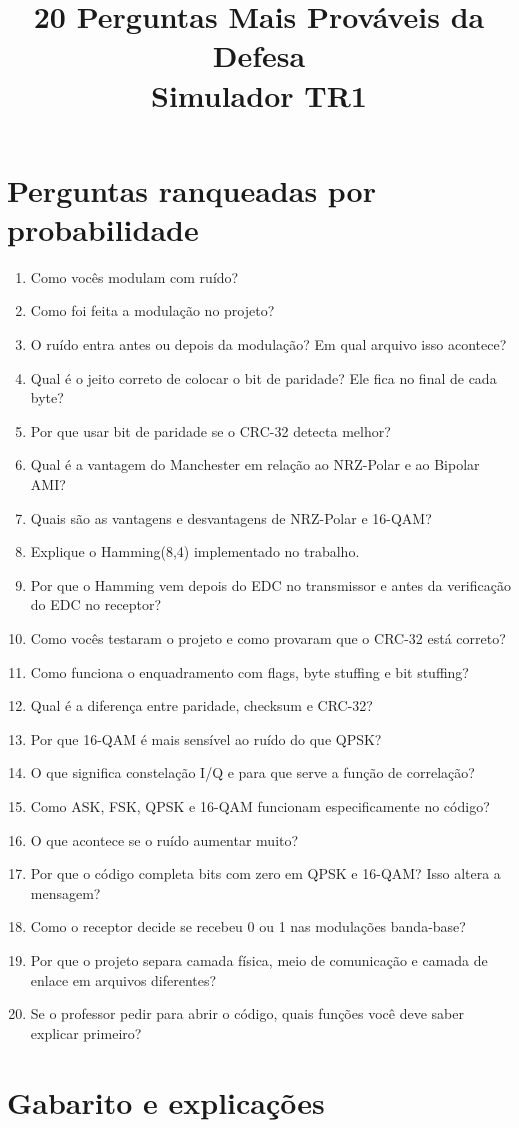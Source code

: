 \documentclass[11pt,a4paper]{article}
\title{\vspace{-1.2cm}20 Perguntas Mais Prováveis da Defesa \\ Simulador TR1}
\author{}
\date{}
\newcommand{\rank}[1]{\textcolor{rankblue}{\textbf{Rank #1}}}
\newcommand{\pergunta}[2]{\item[\rank{#1}.] #2}
\begin{document}
\maketitle
\vspace{-1.0cm}

\section*{Perguntas ranqueadas por probabilidade}

\begin{enumerate}[leftmargin=2.3cm, itemsep=2pt]
  \pergunta{1}{Como vocês modulam com ruído?}
  \pergunta{2}{Como foi feita a modulação no projeto?}
  \pergunta{3}{O ruído entra antes ou depois da modulação? Em qual arquivo isso acontece?}
  \pergunta{4}{Qual é o jeito correto de colocar o bit de paridade? Ele fica no final de cada byte?}
  \pergunta{5}{Por que usar bit de paridade se o CRC-32 detecta melhor?}
  \pergunta{6}{Qual é a vantagem do Manchester em relação ao NRZ-Polar e ao Bipolar AMI?}
  \pergunta{7}{Quais são as vantagens e desvantagens de NRZ-Polar e 16-QAM?}
  \pergunta{8}{Explique o Hamming(8,4) implementado no trabalho.}
  \pergunta{9}{Por que o Hamming vem depois do EDC no transmissor e antes da verificação do EDC no receptor?}
  \pergunta{10}{Como vocês testaram o projeto e como provaram que o CRC-32 está correto?}
  \pergunta{11}{Como funciona o enquadramento com flags, byte stuffing e bit stuffing?}
  \pergunta{12}{Qual é a diferença entre paridade, checksum e CRC-32?}
  \pergunta{13}{Por que 16-QAM é mais sensível ao ruído do que QPSK?}
  \pergunta{14}{O que significa constelação I/Q e para que serve a função de correlação?}
  \pergunta{15}{Como ASK, FSK, QPSK e 16-QAM funcionam especificamente no código?}
  \pergunta{16}{O que acontece se o ruído aumentar muito?}
  \pergunta{17}{Por que o código completa bits com zero em QPSK e 16-QAM? Isso altera a mensagem?}
  \pergunta{18}{Como o receptor decide se recebeu 0 ou 1 nas modulações banda-base?}
  \pergunta{19}{Por que o projeto separa camada física, meio de comunicação e camada de enlace em arquivos diferentes?}
  \pergunta{20}{Se o professor pedir para abrir o código, quais funções você deve saber explicar primeiro?}
\end{enumerate}

\newpage

\section*{Gabarito e explicações}
\end{document}
